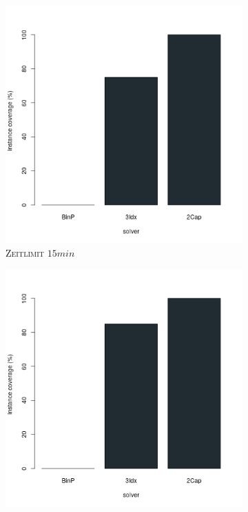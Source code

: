 \begin{figure}[H]
\centering

\begin{subfigure}[b]{0.3\textwidth}
\centering
\includegraphics[width=1.2\textwidth]{img/solver_instance_coverage_b=2_l_900s.png}
\caption{\textsc{Zeitlimit} $15min$}
\label{fig:instance_cov_b=2_l_a}
\end{subfigure}
\hfill
\begin{subfigure}[b]{0.3\textwidth}
\centering
\includegraphics[width=1.2\textwidth]{img/solver_instance_coverage_b=2_l_1800s.png}

\end{subfigure}
\end{figure}
